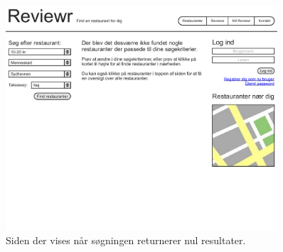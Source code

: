 \documentclass[a4paper, 12pt]{article}
\begin{document}
\begin{figure}[hp]
  \centering
  \includegraphics[width=0.9\textwidth]{mockup/page5.pdf}
  \caption{Siden der vises når søgningen returnerer nul resultater.}
\end{figure}

\printbibliography[heading=bibnumbered,title=Litteraturliste]
\end{document}
